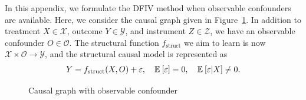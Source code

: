 In this appendix, we formulate the DFIV method when observable confounders are available. Here, we consider the causal graph given in Figure~\ref{fig:observable_confounder}.  In addition to treatment $X \in \mathcal{X}$, outcome $Y \in \mathcal{Y}$, and instrument $Z \in \mathcal{Z}$, we have an observable confounder $O \in \mathcal{O}$. The structural function $f_\mathrm{struct}$ we aim to learn is now $\mathcal{X} \times \mathcal{O} \to \mathcal{Y}$, and the structural causal model is represented as
\begin{align*}
    Y = f_\mathrm{struct}(X, O) + \varepsilon, \quad \mathbb{E}_{}\left[\varepsilon\right] = 0, \quad \mathbb{E}_{}\left[\varepsilon | X\right] \neq 0.
\end{align*}


\begin{figure}
    \centering
    \caption{Causal graph with observable confounder}
    \label{fig:observable_confounder}
\end{figure}


